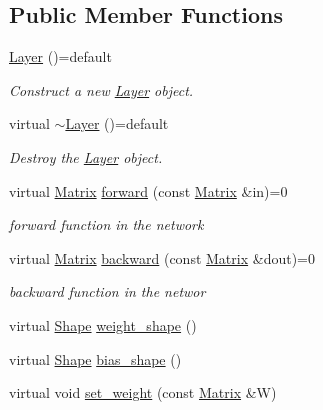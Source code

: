 \subsection*{Public Member Functions}
\begin{DoxyCompactItemize}
\item 
\mbox{\hyperlink{class_layer_a7db1fc76bec3431efbb0984192e2ae23}{Layer}} ()=default
\begin{DoxyCompactList}\small\item\em Construct a new \mbox{\hyperlink{class_layer}{Layer}} object. \end{DoxyCompactList}\item 
virtual \mbox{\hyperlink{class_layer_ac2c7d2238eb3d09a2198736c5b10f940}{$\sim$\+Layer}} ()=default
\begin{DoxyCompactList}\small\item\em Destroy the \mbox{\hyperlink{class_layer}{Layer}} object. \end{DoxyCompactList}\item 
virtual \mbox{\hyperlink{class_layer_a22b1e7286096aa62bd245536c8ebdaf1}{Matrix}} \mbox{\hyperlink{class_layer_ab15b665c86974b1cf1d7ba4e309cb0e5}{forward}} (const \mbox{\hyperlink{class_layer_a22b1e7286096aa62bd245536c8ebdaf1}{Matrix}} \&in)=0
\begin{DoxyCompactList}\small\item\em forward function in the network \end{DoxyCompactList}\item 
virtual \mbox{\hyperlink{class_layer_a22b1e7286096aa62bd245536c8ebdaf1}{Matrix}} \mbox{\hyperlink{class_layer_ac4c13a3a85bfdd4d7d4d18669e3299fe}{backward}} (const \mbox{\hyperlink{class_layer_a22b1e7286096aa62bd245536c8ebdaf1}{Matrix}} \&dout)=0
\begin{DoxyCompactList}\small\item\em backward function in the networ \end{DoxyCompactList}\item 
virtual \mbox{\hyperlink{class_layer_a8313f42d2292d12dd5d40cc115636693}{Shape}} \mbox{\hyperlink{class_layer_afa0ec609fc7ef0053a362ea54d0f6f78}{weight\+\_\+shape}} ()
\item 
virtual \mbox{\hyperlink{class_layer_a8313f42d2292d12dd5d40cc115636693}{Shape}} \mbox{\hyperlink{class_layer_ad557254136784e9312ebb197b2bd3faf}{bias\+\_\+shape}} ()
\item 
virtual void \mbox{\hyperlink{class_layer_a8fd54bf1a860868b13f4365a264c693c}{set\+\_\+weight}} (const \mbox{\hyperlink{class_layer_a22b1e7286096aa62bd245536c8ebdaf1}{Matrix}} \&W)

\end{DoxyCompactItemize}
